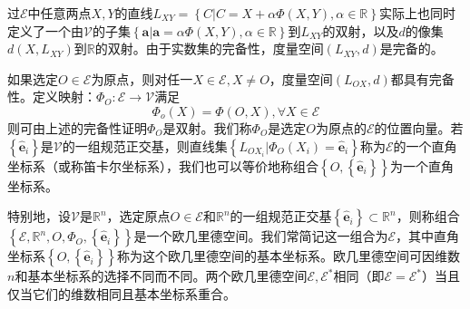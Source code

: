 \documentclass[main.tex]{subfiles}
\begin{document}
过$\mathcal{E}$中任意两点$X,Y$的直线$L_{XY}=\left\{C|C=X+\alpha\Phi\left(X,Y\right),\alpha\in\mathbb{R}\right\}$实际上也同时定义了一个由$\mathcal{V}$的子集$\left\{\mathbf{a}|\mathbf{a}=\alpha\Phi\left(X,Y\right),\alpha\in\mathbb{R}\right\}$到$L_{XY}$的双射，以及$d$的像集$d\left(X,L_{XY}\right)$到$\mathbb{R}$的双射。由于实数集的完备性，度量空间$\left(L_{XY},d\right)$是完备的。

如果选定$O\in\mathcal{E}$为原点，则对任一$X\in\mathcal{E},X\neq O$，度量空间$\left(L_{OX},d\right)$都具有完备性。定义映射：$\Phi_O:\mathcal{E}\rightarrow\mathcal{V}$满足
\[\Phi_o\left(X\right)=\Phi\left(O,X\right),\forall X\in\mathcal{E}
\]
则可由上述的完备性证明$\Phi_O$是双射。我们称$\Phi_O$是选定$O$为原点的$\mathcal{E}$的位置向量。若$\left\{\mathbf{\hat{e}}_i\right\}$是$\mathcal{V}$的一组规范正交基，则直线集$\left\{L_{OX_i}|\Phi_O\left(X_i\right)=\mathbf{\hat{e}}_i\right\}$称为$\mathcal{E}$的一个直角坐标系（或称笛卡尔坐标系），我们也可以等价地称组合$\left\{O,\left\{\mathbf{\hat{e}}_i\right\}\right\}$为一个直角坐标系。

特别地，设$\mathcal{V}$是$\mathbb{R}^n$，选定原点$O\in\mathcal{E}$和$\mathbb{R}^n$的一组规范正交基$\left\{\mathbf{\hat{e}}_i\right\}\subset\mathbb{R}^n$，则称组合$\left\{\mathcal{E},\mathbb{R}^n,O,\Phi_O,\left\{\mathbf{\hat{e}}_i\right\}\right\}$是一个欧几里德空间。我们常简记这一组合为$\mathcal{E}$，其中直角坐标系$\left\{O,\left\{\mathbf{\hat{e}}_i\right\}\right\}$称为这个欧几里德空间的基本坐标系。欧几里德空间可因维数$n$和基本坐标系的选择不同而不同。两个欧几里德空间$\mathcal{E},\mathcal{E}^*$相同（即$\mathcal{E}=\mathcal{E}^*$）当且仅当它们的维数相同且基本坐标系重合。
\end{document}
